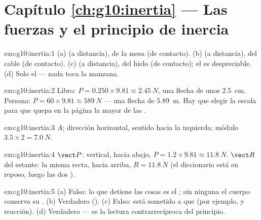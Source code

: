 \section*{Capítulo \ref{ch:g10:inertia} --- Las fuerzas y el principio de inercia}

\begin{solution}{exo:g10:inertia:1}
(a)  (a distancia),  de la mesa (de contacto).
(b)  (a distancia),  del cable (de contacto).
(c)  (a distancia),  del hielo (de contacto); el
 es despreciable. (d) Solo el  --- nada toca la manzana.
\end{solution}

\begin{solution}{exo:g10:inertia:2}
Libro: $P = 0.250 \times 9.81 \approx \qty{2.45}{N}$, una flecha de unos
\qty{2.5}{cm}. Persona: $P = 60 \times 9.81 \approx \qty{589}{N}$ ---
una flecha de \qty{5.89}{m}. Hay que elegir la escala para que quepa en
la página la mayor de las .
\end{solution}

\begin{solution}{exo:g10:inertia:3}
 $A$; dirección horizontal, sentido hacia la
izquierda; módulo $3.5 \times 2 = \qty{7.0}{N}$.
\end{solution}

\begin{solution}{exo:g10:inertia:4}
 $\vect P$: vertical, hacia abajo,
$P = 1.2 \times 9.81 \approx \qty{11.8}{N}$.  $\vect R$
del estante: la misma recta, hacia arriba, $R = \qty{11.8}{N}$ (el
diccionario está en reposo, luego las dos ).
\end{solution}

\begin{solution}{exo:g10:inertia:5}
(a) Falso: lo que detiene las cosas es el ; sin ninguna 
el cuerpo conserva su . (b) Verdadero
(). (c) Falso: está sometido a  que
\emph{} (por ejemplo,  y reacción). (d) Verdadero --- es
la lectura contrarrecíproca del principio.
\end{solution}

